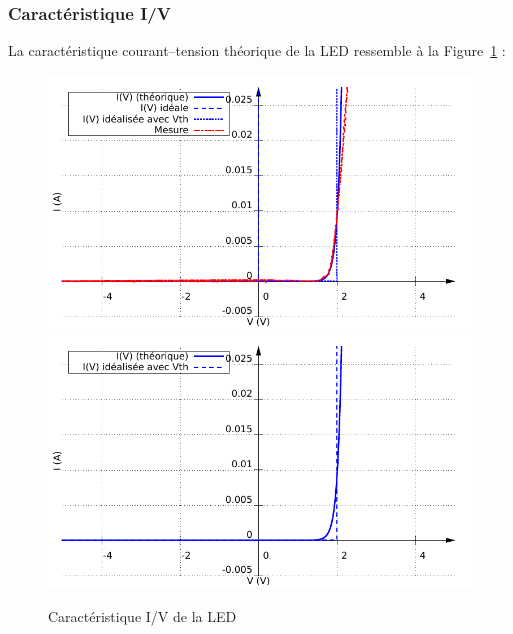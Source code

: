 \documentclass{../template/labo}
\begin{document}

\newpage
\subsubsection{Caractéristique I/V}
La caractéristique courant--tension théorique de la LED ressemble à la Figure~\ref{fig:carac_LED} :
\begin{figure}[h!]
	\vspace{-0.5cm}
	\begin{center}
	 {\includegraphics[width=\linewidth]{mesures/carac_mes.pdf}} {\includegraphics[width=12cm]{figures/carac.pdf}}
	\end{center}\vspace{-0.5cm}
\caption{Caractéristique I/V de la LED}
\label{fig:carac_LED}
\end{figure}	
\end{document}
